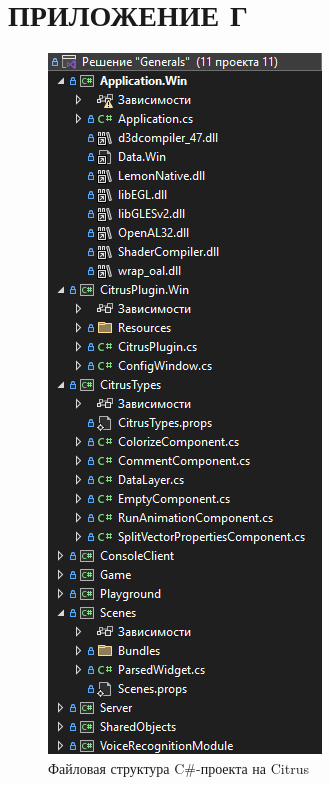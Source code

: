 \section*{ПРИЛОЖЕНИЕ Г}
\begin{figure}[H]
    \centering
    \caption{Файловая структура C\#-проекта на Citrus}\label{app2}
    \includegraphics[height=0.85\textheight]{pictures/citrus_fs.png}
\end{figure}
\pagebreak

